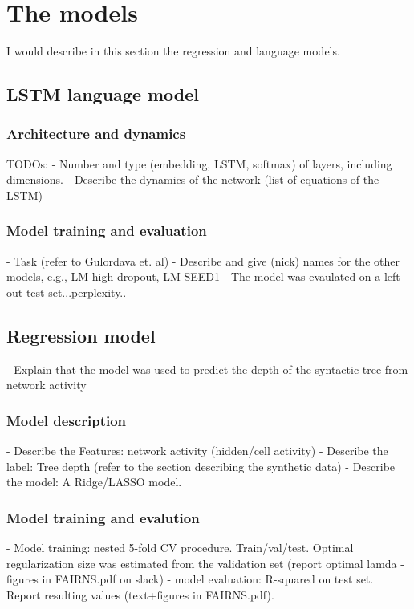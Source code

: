 
\section{The models}
I would describe in this section the regression and language models. 


\subsection{LSTM language model}
\subsubsection{Architecture and dynamics}
TODOs:
- Number and type (embedding, LSTM, softmax) of layers, including dimensions. 
- Describe the dynamics of the network (list of equations of the LSTM)

\subsubsection{Model training and evaluation}
- Task (refer to Gulordava et. al)
- Describe and give (nick) names for the other models, e.g., LM-high-dropout, LM-SEED1
- The model was evaulated on a left-out test set...perplexity..

\subsection{Regression model}
- Explain that the model was used to predict the depth of the syntactic tree from network activity
\subsubsection{Model description}
- Describe the Features: network activity (hidden/cell activity)
- Describe the label: Tree depth (refer to the section describing the synthetic data)
- Describe the model: A Ridge/LASSO model.
\subsubsection{Model training and evalution}
- Model training: nested 5-fold CV procedure. Train/val/test. Optimal regularization size was estimated from the validation set (report optimal lamda - figures in FAIRNS.pdf on slack)
- model evaluation: R-squared on test set. Report resulting values (text+figures in FAIRNS.pdf). 


